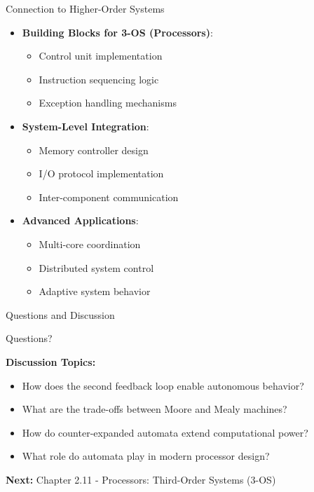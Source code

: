 \documentclass[aspectratio=169,11pt]{beamer}
\newcommand{\concept}[1]{\textbf{\color{accentcolor}#1}}
\begin{document}
\begin{frame}{Connection to Higher-Order Systems}
\begin{itemize}
\item \concept{Building Blocks for 3-OS (Processors)}:
\begin{itemize}
\item Control unit implementation
\item Instruction sequencing logic
\item Exception handling mechanisms
\end{itemize}
\vspace{0.3cm}
\item \concept{System-Level Integration}:
\begin{itemize}
\item Memory controller design
\item I/O protocol implementation
\item Inter-component communication
\end{itemize}
\vspace{0.3cm}
\item \concept{Advanced Applications}:
\begin{itemize}
\item Multi-core coordination
\item Distributed system control
\item Adaptive system behavior
\end{itemize}
\end{itemize}
\end{frame}

\begin{frame}{Questions and Discussion}
\begin{center}
\Large
Questions?

\vspace{1cm}

\normalsize
\textbf{Discussion Topics:}
\begin{itemize}
\item How does the second feedback loop enable autonomous behavior?
\item What are the trade-offs between Moore and Mealy machines?
\item How do counter-expanded automata extend computational power?
\item What role do automata play in modern processor design?
\end{itemize}

\vspace{0.5cm}
\textbf{Next:} Chapter 2.11 - Processors: Third-Order Systems (3-OS)
\end{center}
\end{frame}
\end{document}
